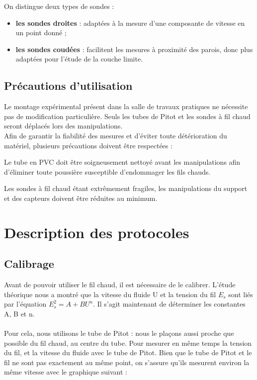 \documentclass[12pt, a4paper]{report}
\begin{document}
	\noindent On distingue deux types de sondes :
	\vspace{1mm}
	\begin{itemize}
		\item \textbf{les sondes droites} : adaptées à la mesure d'une composante de vitesse en un point donné ;
		\item \textbf{les sondes coudées} : facilitent les mesures à proximité des parois, donc plus adaptées pour l'étude de la couche limite.
	\end{itemize}
	
	\subsection{Précautions d'utilisation}
	
	\noindent Le montage expérimental présent dans la salle de travaux pratiques ne nécessite pas de modification particulière. Seuls les tubes de Pitot et les sondes à fil chaud seront déplacés lors des manipulations.\\
	
	\noindent Afin de garantir la fiabilité des mesures et d'éviter toute détérioration du matériel, plusieurs précautions doivent être respectées :
	\vspace{1mm}
	\begin{itemizeFB}
		
		\item Le tube en PVC doit être soigneusement nettoyé avant les manipulations afin d'éliminer toute poussière susceptible d'endommager les fils chauds.
		
		\item Les sondes à fil chaud étant extrêmement fragiles, les manipulations du support et des capteurs doivent être réduites au minimum.
		
	\end{itemizeFB}
	
	
	
	\section{Description des protocoles}
	\subsection{Calibrage}
	Avant de pouvoir utiliser le fil chaud, il est nécessaire de le calibrer. L'étude théorique nous a montré que la vitesse du fluide U et la tension du fil $E_s$ sont liés par l'équation $E_s^2 = A + B U^n$. Il s'agit maintenant de déterminer les constantes A, B et n.\\\\
	Pour cela, nous utilisons le tube de Pitot : nous le plaçons aussi proche que possible du fil chaud, au centre du tube. Pour mesurer en même temps la tension du fil, et la vitesse du fluide avec le tube de Pitot. Bien que le tube de Pitot et le fil ne sont pas exactement au même point, on s'assure qu'ils mesurent environ la même vitesse avec le graphique suivant :  
\end{document}
